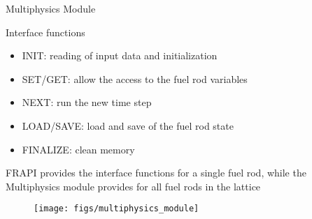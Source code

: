 \begin{frame}{Multiphysics Module}

    \scriptsize

    \begin{block}{Interface functions}
        \begin{itemize}
            \item INIT: reading of input data and initialization
            \item SET/GET: allow the access to the fuel rod variables
            \item NEXT: run the new time step
            \item LOAD/SAVE: load and save of the fuel rod state
            \item FINALIZE: clean memory
        \end{itemize}
    \end{block}

    \begin{block}{}
        FRAPI provides the interface functions for a single fuel rod, while
        the Multiphysics module provides for all fuel rods in the lattice
    \end{block}

  \begin{figure}[h]
    \texttt{[image: figs/multiphysics\_module]}
  \end{figure}  

\end{frame}